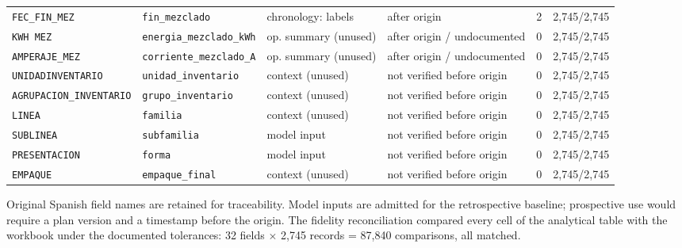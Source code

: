 \begin{table}[!htbp]
\begin{tabularx}{\linewidth}{@{}>{\raggedright\arraybackslash}p{.16\linewidth}>{\raggedright\arraybackslash}p{.23\linewidth}>{\raggedright\arraybackslash}p{.15\linewidth}>{\raggedright\arraybackslash}Xrr@{}}
\texttt{FEC\_\allowbreak{}FIN\_\allowbreak{}MEZ} & \texttt{fin\_\allowbreak{}mezclado} & chronology: labels & after origin & 2 & 2,745/2,745 \\
\texttt{KWH MEZ} & \texttt{energia\_\allowbreak{}mezclado\_\allowbreak{}kWh} & op. summary (unused) & after origin / undocumented & 0 & 2,745/2,745 \\
\texttt{AMPERAJE\_\allowbreak{}MEZ} & \texttt{corriente\_\allowbreak{}mezclado\_\allowbreak{}A} & op. summary (unused) & after origin / undocumented & 0 & 2,745/2,745 \\
\texttt{UNIDADINVENTARIO} & \texttt{unidad\_\allowbreak{}inventario} & context (unused) & not verified before origin & 0 & 2,745/2,745 \\
\texttt{AGRUPACION\_\allowbreak{}INVENTARIO} & \texttt{grupo\_\allowbreak{}inventario} & context (unused) & not verified before origin & 0 & 2,745/2,745 \\
\texttt{LINEA} & \texttt{familia} & context (unused) & not verified before origin & 0 & 2,745/2,745 \\
\texttt{SUBLINEA} & \texttt{subfamilia} & model input & not verified before origin & 0 & 2,745/2,745 \\
\texttt{PRESENTACION} & \texttt{forma} & model input & not verified before origin & 0 & 2,745/2,745 \\
\texttt{EMPAQUE} & \texttt{empaque\_\allowbreak{}final} & context (unused) & not verified before origin & 0 & 2,745/2,745 \\
\bottomrule
\end{tabularx}
\par\vspace{3pt}\footnotesize Original Spanish field names are retained for traceability. Model inputs are admitted for the retrospective baseline; prospective use would require a plan version and a timestamp before the origin. The fidelity reconciliation compared every cell of the analytical table with the workbook under the documented tolerances: 32 fields $\times$ 2,745 records = 87,840 comparisons, all matched.
\end{table}
